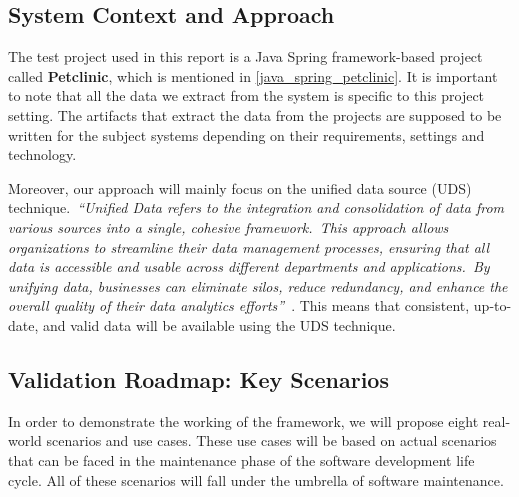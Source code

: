 \subsection{System Context and Approach}
The test project used in this report is a Java Spring framework-based project called \textbf{Petclinic}, which is mentioned in \autoref{java_spring_petclinic}. It is important to note that all the data we extract from the system is specific to this project setting. The artifacts that extract the data from the projects are supposed to be written for the subject systems depending on their requirements, settings and technology.

Moreover, our approach will mainly focus on the unified data source (UDS) technique.~\textit{``Unified Data refers to the integration and consolidation of data from various sources into a single, cohesive framework.\ This approach allows organizations to streamline their data management processes, ensuring that all data is accessible and usable across different departments and applications.\ By unifying data, businesses can eliminate silos, reduce redundancy, and enhance the overall quality of their data analytics efforts''}~\citep{unifiedData2025}. This means that consistent, up-to-date, and valid data will be available using the UDS technique.

\subsection{Validation Roadmap: Key Scenarios}\label{ch3:validation_roadmap}

In order to demonstrate the working of the framework, we will propose eight real-world scenarios and use cases. These use cases will be based on actual scenarios that can be faced in the maintenance phase of the software development life cycle. All of these scenarios will fall under the umbrella of software maintenance.

